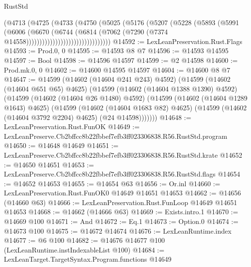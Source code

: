 \begin{lexlean}{RustStd}
\begin{coremodule}
                                  (@4713
                                    (@4725
                                      (@4733
                                        (@4750
                                          (@5025
                                            (@5176
                                              (@5207
                                                (@5228
                                                  (@5893
                                                    (@5991
                                                      (@6006
                                                        (@6670
                                                          (@6744
                                                            (@6814
                                                              (@7062
                                                                (@7290
                                                                  (@7374
                                                                    @14558))))))))))))))))))))))))))))))))
@14592 := LexLeanPreservation.Rust.Flags
@14593 := Prod.{0, 0}
@14595 := @14593 @8 @7
@14596 := @14593 @14595
@14597 := Bool
@14598 := @14596 @14597
@14599 := @2 @14598
@14600 := Prod.mk.{0, 0}
@14602 := @14600 @14595 @14597
@14604 := @14600 @8 @7
@14647 := @14599
    (@14602 (@14604 @241 @243) @4592)
    (@14599
      (@14602 (@14604 @651 @65) @4625)
      (@14599
        (@14602 (@14604 @1388 @1390) @4592)
        (@14599
          (@14602 (@14604 @26 @1480) @4592)
          (@14599
            (@14602 (@14604 @1289 @1643) @4625)
            (@14599
              (@14602 (@14604 @1683 @82) @4625)
              (@14599 (@14602 (@14604 @3792 @2204) @4625) (@24 @14598)))))))
@14648 := LexLeanPreservation.Rust.FunOK
@14649 := LexLeanPreserve.Cb2bffcc8b22fbbef7efb3ff023306838.R56.RustStd.program
@14650 := @14648 @14649
@14651 := LexLeanPreserve.Cb2bffcc8b22fbbef7efb3ff023306838.R56.RustStd.krate
@14652 := @14650 @14651
@14653 := LexLeanPreserve.Cb2bffcc8b22fbbef7efb3ff023306838.R56.RustStd.flags
@14654 := @14652 @14653
@14655 := @14654 @63
@14656 := Or.inl
@14660 := LexLeanPreservation.Rust.FunOK0 @14649 @14651 @14653
@14662 := @14656 (@14660 @63)
@14666 := LexLeanPreservation.Rust.FunLoop @14649 @14651 @14653
@14668 := @14662 (@14666 @63)
@14669 := Exists.intro.{1}
@14670 := @14669 @100
@14671 := And
@14672 := Eq.{1}
@14673 := Option.{0}
@14674 := @14673 @100
@14675 := @14672 @14674
@14676 := LexLeanRuntime.index
@14677 := @6 @100
@14682 := @14676 @14677 @100 (LexLeanRuntime.instIndexableList @100)
@14684 := LexLeanTarget.TargetSyntax.Program.functions @14649

\end{coremodule}
\end{lexlean}
